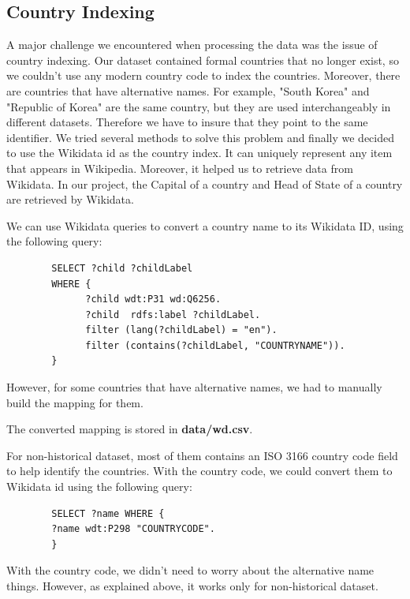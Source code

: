\documentclass[12pt, fullpage,letterpaper]{article}
\begin{document}
\subsection{Country Indexing}
    A major challenge we encountered when processing the data was the issue of country indexing. Our dataset contained 
    formal countries that no longer exist, so we couldn't use any modern country code to index the countries.
    Moreover, there are countries that have alternative names. For example, "South Korea" and "Republic of Korea" are the same country,
    but they are used interchangeably in different datasets.
    Therefore we have to insure that they point to the same identifier.
    We tried several methods to solve this problem and 
    finally we decided to use the Wikidata id as the country index. It can uniquely represent any item that appears in Wikipedia.
    Moreover, it helped us to retrieve data from Wikidata. In our project, the Capital of a country and Head of State of a country are retrieved by Wikidata.

    We can use Wikidata queries to convert a country name to its Wikidata ID, using the following query:

        \begin{verbatim}
        SELECT ?child ?childLabel
        WHERE {
              ?child wdt:P31 wd:Q6256.
              ?child  rdfs:label ?childLabel.
              filter (lang(?childLabel) = "en").
              filter (contains(?childLabel, "COUNTRYNAME")).
        }
        \end{verbatim}

        However, for some countries that have alternative names, we had to manually build the mapping for them.

        The converted mapping is stored in \textbf{data/wd.csv}.

        For non-historical dataset, most of them contains an ISO 3166 country code field to help identify the countries. With the country code,
        we could convert them to Wikidata id using the following query:

        \begin{verbatim}
        SELECT ?name WHERE {
        ?name wdt:P298 "COUNTRYCODE".
        }
        \end{verbatim}

        With the country code, we didn't need to worry about the alternative name things. However, as explained above,
        it works only for non-historical dataset.
        
\end{document}
